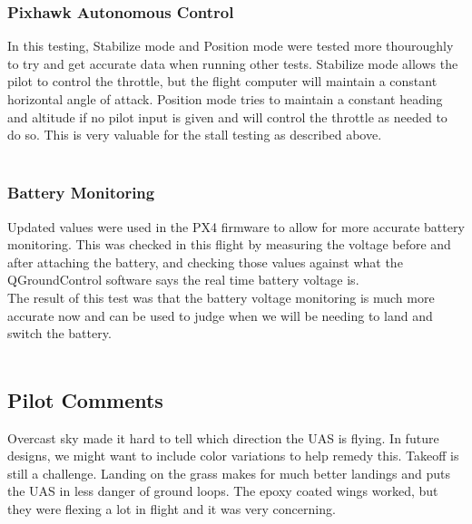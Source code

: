 \documentclass{article}
\begin{document}
\subsubsection*{Pixhawk Autonomous Control}
In this testing, Stabilize mode and Position mode were tested more thouroughly to try and get accurate data when running other tests. Stabilize mode allows the pilot to control the throttle, but the flight computer will maintain a constant horizontal angle of attack. Position mode tries to maintain a constant heading and altitude if no pilot input is given and will control the throttle as needed to do so. This is very valuable for the stall testing as described above. \\ \\
\subsubsection*{Battery Monitoring}
Updated values were used in the PX4 firmware to allow for more accurate battery monitoring. This was checked in this flight by measuring the voltage before and after attaching the battery, and checking those values against what the QGroundControl software says the real time battery voltage is. \\ 
The result of this test was that the battery voltage monitoring is much more accurate now and can be used to judge when we will be needing to land and switch the battery. \\ \\

\subsection*{Pilot Comments}
Overcast sky made it hard to tell which direction the UAS is flying. In future designs, we might want to include color variations to help remedy this. Takeoff is still a challenge. Landing on the grass makes for much better landings and puts the UAS in less danger of ground loops. The epoxy coated wings worked, but they were flexing a lot in flight and it was very concerning.

\end{document}
